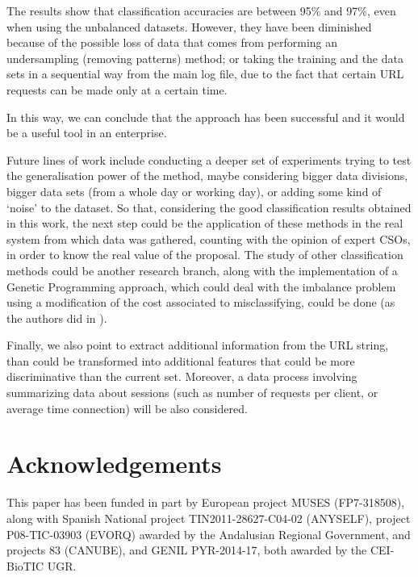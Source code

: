 \documentclass{llncs}
\begin{document}
The results show that classification accuracies are between 95\% and 97\%, even when using the unbalanced datasets. However, they have been diminished because of the possible loss of data that comes from performing an undersampling (removing patterns) method; or taking the training and the data sets in a sequential way from the main log file, due to the fact that certain URL requests can be made only at a certain time.

In this way, we can conclude that the approach has been successful and it would be a useful tool in an enterprise.

% 
Future lines of work include conducting a deeper set of experiments trying to test the generalisation power of the method, maybe considering bigger data divisions, bigger data sets (from a whole day or working day), or adding some kind of `noise' to the dataset.
So that, considering the good classification results obtained in this work, the next step could be the application of these methods in the real system from which data was gathered, counting with the opinion of expert CSOs, in order to know the real value of the proposal.
The study of other classification methods could be another research branch, along with the implementation of a Genetic Programming approach, which could deal with the imbalance problem using a modification of the cost associated to misclassifying, could be done (as the authors did in \cite{cost_adjustment_07}).

Finally, we also point to extract additional information from the URL string, than could be transformed into additional features that could be more discriminative than the current set. Moreover, a data process involving summarizing data about sessions (such as number of requests per client, or average time connection) will be also considered.



\section*{Acknowledgements}
This paper has been funded in part by European project MUSES (FP7-318508), along with Spanish National project TIN2011-28627-C04-02 (ANYSELF), project P08-TIC-03903 (EVORQ) awarded by the Andalusian Regional Government, and projects 83 (CANUBE), and GENIL PYR-2014-17, both awarded by the CEI-BioTIC UGR.



\end{document}
